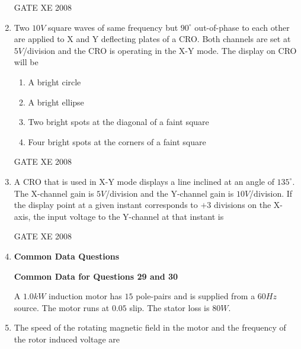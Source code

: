 \documentclass[12pt]{article}
\begin{document}
\begin{enumerate}
GATE XE 2008
\item  Two $10 V$ square waves of same frequency but $90^{\circ}$ out-of-phase to each other are applied to X and Y deflecting plates of a CRO. Both channels are set at $5 V$/division and the CRO is operating in the X-Y mode. The display on CRO will be

\begin{enumerate}

\item  A bright circle

\item  A bright ellipse

\item  Two bright spots at the diagonal of a faint square

\item  Four bright spots at the corners of a faint square
\end{enumerate}

GATE XE 2008
\item  A CRO that is used in X-Y mode displays a line inclined at an angle of $135^{\circ}$. The X-channel gain is $5V$/division and the Y-channel gain is $10V$/division. If the display point at a given instant corresponds to $+ 3$ divisions on the X-axis, the input voltage to the Y-channel at that instant is

\begin{enumerate}
\end{enumerate}

GATE XE 2008
\item[]\textbf{\Large Common Data Questions}

\textbf{Common Data for Questions 29 and 30}

A $1.0 kW$ induction motor has $15$ pole-pairs and is supplied from a $60 Hz$ source. The motor runs at $0.05$ slip. The stator loss is $80 W$.

\item  The speed of the rotating magnetic field in the motor and the frequency of the rotor induced voltage are

\begin{enumerate}
\end{enumerate}


\end{enumerate}
\end{document}

